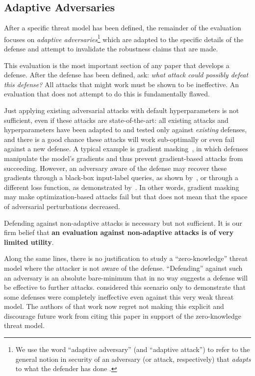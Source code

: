 \documentclass{article} %
\begin{document}
\subsection{Adaptive Adversaries}
\label{sec:adaptive}

After a specific threat model has been defined, the remainder of the evaluation
focuses on \emph{adaptive adversaries}\footnote{We use the word ``adaptive
  adversary'' (and ``adaptive attack'') to refer to the general notion in
  security of an adversary (or attack, respectively)
  that \emph{adapts} to what the defender has done \citep{herley2017sok,carlini2017adversarial}.}
which are adapted to the specific details of the defense and attempt to invalidate
the robustness claims that are made.

This evaluation is the most important section of any paper that develops a
defense.
%
After the defense has been defined, ask: \emph{what attack could possibly defeat this
  defense?} All attacks that might work must be shown to be ineffective.
%
An evaluation that
does not attempt to do this is fundamentally flawed.

Just applying existing adversarial attacks with default hyperparameters
is not sufficient, even if these attacks
are state-of-the-art: all existing attacks and hyperparameters
have been adapted to and tested only against 
\emph{existing} defenses, and there is a good chance these attacks
will work sub-optimally or even fail against a new defense.
%
A typical example is gradient masking~\citep{tramer2017ensemble},
in which defenses manipulate the model's gradients and thus prevent
gradient-based attacks from succeeding.
%
However, an adversary aware of
the defense may recover these gradients through a black-box input-label queries, as
shown by~\citet{papernot2017practical}, or through a different loss
function, as demonstrated by~\cite{athalye2018obfuscated}.
%
In other words, gradient masking may make optimization-based attacks
fail but that does not mean that the space of adversarial perturbations decreased.

Defending against non-adaptive attacks is necessary but not sufficient.
%
It is our firm belief that \textbf{an evaluation against non-adaptive
  attacks is of very limited utility}.

Along the same lines, there is no justification to study a ``zero-knowledge''
\citep{biggio2013evasion} threat model where the attacker
is not aware of the defense.
%
``Defending'' against such an adversary is
an absolute bare-minimum that in no way suggests a defense will be effective
to further attacks. \cite{carlini2017adversarial} considered this scenario only to demonstrate
that some defenses were completely ineffective even against this very weak threat model.
%
The authors of that work now regret not making this explicit and
discourage future work from citing this paper in support of the zero-knowledge threat model.
\end{document}

